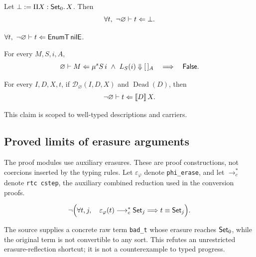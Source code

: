 \begin{conjecture}[Consistency]
Let $\bot:=\Pi X:\mathsf{Set}_0.\,X$. Then
\[
 \forall t,\ \neg\chk{\varnothing}{t}{\bot}.
\]
\end{conjecture}
\begin{conjecture}
$\forall t,\ \neg\chk{\varnothing}{t}{\op{EnumT}\,\op{nilE}}$.
\end{conjecture}
\begin{conjecture}
For every $M,S,i,A$,
\[
 \chk{\varnothing}{M}{\mu^s S\,i}\ \land\ L_S(i)\Downarrow[\,]_A
 \quad\Longrightarrow\quad\mathsf{False}.
\]
\end{conjecture}

\begin{conjecture}
For every $I,D,X,t$, if $\mathcal D_{\varnothing}(I,D,X)$ and $\operatorname{Dead}(D)$, then
\[
 \neg\varnothing\vdash t\Leftarrow \llbracket D\rrbracket\,X.
\]
\end{conjecture}
\noindent This claim is scoped to well-typed descriptions and carriers.

\subsection{Proved limits of erasure arguments}
The proof modules use auxiliary erasures. These are proof constructions, not coercions inserted by the typing rules. Let $\varepsilon_\varphi$ denote \texttt{phi\_erase}, and let $\longrightarrow_c^*$ denote \texttt{rtc cstep}, the auxiliary combined reduction used in the conversion proofs.
\begin{theorem}
\[
 \neg\Bigl(\forall t,j,\quad
 \varepsilon_\varphi(t)\longrightarrow_c^*\mathsf{Set}_j
 \Longrightarrow t\equiv\mathsf{Set}_j\Bigr).
\]
\end{theorem}
\noindent The source supplies a concrete raw term \texttt{bad\_t} whose erasure reaches $\mathsf{Set}_0$, while the original term is not convertible to any sort. This refutes an unrestricted erasure-reflection shortcut; it is not a counterexample to typed progress.

